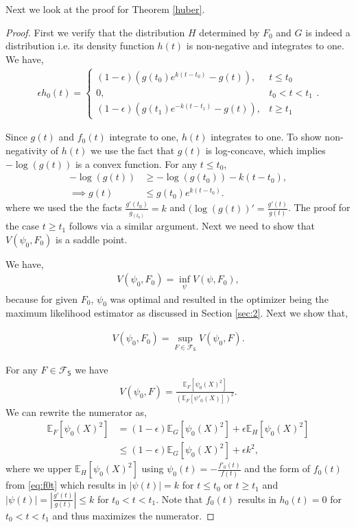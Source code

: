 \documentclass{article}
\newcommand{\abs}[1]{\ensuremath{\left|#1\right|}}
\renewcommand{\E}{\ensuremath{\mathbb{E}}}
\newcommand{\Ep}{\ensuremath{\mathbb{E}_F}}
\begin{document}
Next we look at the proof for Theorem \ref{huber}.\\
\begin{proof}
First we verify that the distribution $H$ determined by $F_0$ and $G$ is indeed a distribution i.e. its density function $h(t)$ is non-negative and integrates to one. We have,
\begin{align}
    \epsilon h_0(t) = \begin{cases} (1 - \epsilon)(g(t_0)e^{k(t-t_0)} - g(t)), & t \leq t_0\\ 0, & t_0 < t < t_1\\ (1-\epsilon)(g(t_1)e^{-k(t-t_1)} - g(t)), & t \geq t_1\end{cases}. \label{eq:h0t}
\end{align}

Since $g(t)$ and $f_0(t)$ integrate to one, $h(t)$ integrates to one. To show non-negativity of $h(t)$ we use the fact that $g(t)$ is log-concave, which implies $-\log(g(t))$ is a convex function. For any $t\leq t_0$, 
\begin{align*}
    -\log(g(t)) & \geq -\log(g(t_0)) - k (t- t_0),\\
    \implies  g(t) &\leq g(t_0) e^{k(t-t_0)}.
\end{align*}
where we used the the facts $\frac{g'(t_0)}{g_(t_0)} = k$ and $(\log(g(t))' = \frac{g'(t)}{g(t)}$. The proof for the case $t \geq t_1$ follows via a similar argument. Next we need to show that $V(\psi_0, F_0)$ is a saddle point. 

We have,
\begin{align*}
    V(\psi_0, F_0) = \inf\limits_\psi V(\psi, F_0),
\end{align*}
because for given $F_0$, $\psi_0$ was optimal and resulted in the optimizer being the maximum likelihood estimator as discussed in Section \ref{sec:2}. Next we show that,

\begin{align*}
    V(\psi_0, F_0) = \sup\limits_{F\in \mathcal{F}_{\mathsf{S}}} V(\psi_0, F).
\end{align*}

For any $F\in \mathcal{F}_{\mathsf{S}}$ we have
\begin{align*}
    V(\psi_0, F) =   \frac{\Ep[\psi_0(X)^2]}{(\Ep[\psi'_0(X)])^2}.
\end{align*}
We can rewrite the numerator as,
\begin{align*}
    \Ep[\psi_0(X)^2] &= (1- \epsilon) \E_G[\psi_0(X)^2] + \epsilon\E_{H}[\psi_0(X)^2]\\
    &\leq  (1- \epsilon) \E_G[\psi_0(X)^2] + \epsilon k^2,
\end{align*}
where we upper $\E_H[\psi_0(X)^2]$ using $\psi_0(t) = -\frac{f'_0(t)}{f(t)}$ and the form of $f_0(t)$ from \eqref{eq:f0t} which results in $\abs{\psi(t)} = k $ for $t \leq t_0$ or $t \geq t_1$ and $\abs{\psi(t)} = \abs{\frac{g'(t)}{g(t)}} \leq k$ for $t_0 < t < t_1$. Note that $f_0(t)$ results in $h_0(t) = 0 $ for $t_0 < t < t_1$ and thus maximizes the numerator.




\end{proof}
\end{document}
